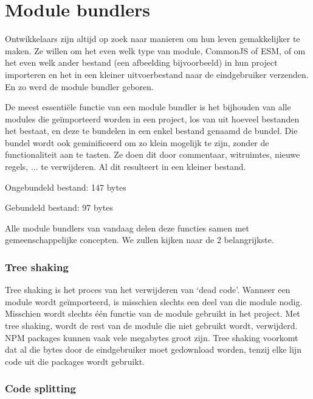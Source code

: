 \section{Module bundlers}

Ontwikkelaars zijn altijd op zoek naar manieren om hun leven gemakkelijker te maken. Ze willen om het even welk type van module, CommonJS of ESM, of om het even welk ander bestand (een afbeelding bijvoorbeeld) in hun project importeren en het in een kleiner uitvoerbestand naar de eindgebruiker verzenden. En zo werd de module bundler geboren.

De meest essentiële functie van een module bundler is het bijhouden van alle modules die geïmporteerd worden in een project, los van uit hoeveel bestanden het bestaat, en deze te bundelen in een enkel bestand genaamd de bundel. Die bundel wordt ook geminificeerd om zo klein mogelijk te zijn, zonder de functionaliteit aan te tasten. Ze doen dit door commentaar, witruimtes, nieuwe regels, ... te verwijderen. Al dit resulteert in een kleiner bestand.

Ongebundeld bestand: 147 bytes

Gebundeld bestand: 97 bytes


Alle module bundlers van vandaag delen deze functies samen met gemeenschappelijke concepten. We zullen kijken naar de 2 belangrijkste. 

\subsubsection{Tree shaking}

Tree shaking is het proces van het verwijderen van ‘dead code’. Wanneer een module wordt geïmporteerd, is misschien slechts een deel van die module nodig. Misschien wordt slechts één functie van de module gebruikt in het project. Met tree shaking, wordt de rest van de module die niet gebruikt wordt, verwijderd. NPM \gls{packages} kunnen vaak vele megabytes groot zijn. Tree shaking voorkomt dat al die bytes door de eindgebruiker moet gedownload worden, tenzij elke lijn code uit die \gls{packages} wordt gebruikt. 

\subsubsection{Code splitting}

